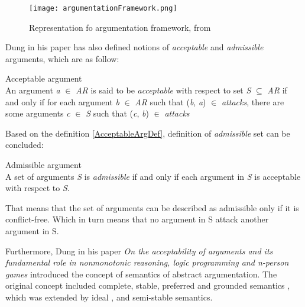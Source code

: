 \begin{figure}[h]
	\centering
	\texttt{[image: argumentationFramework.png]}
	\caption{Representation fo argumentation framework, from \cite{argumentationFrameworkExample}}
	\label{fig:argumentationFrameworkFigure}
\end{figure}
 
Dung in his paper \cite{dung1995} has also defined notions of \textit{acceptable} and \textit{admissible} arguments, which are as follow:

\begin{definition}{Acceptable argument}
\label{AcceptableArgDef}\\
An argument \textit{a} $\in$ \textit{AR} is said to be \textit{acceptable} with respect to set \textit{S} $\subseteq$ \textit{AR} if and only if for each argument \textit{b} $\in$ \textit{AR} such that (\textit{b}, \textit{a}) $\in$ \textit{attacks}, there are some arguments \textit{c} $\in$ \textit{S} such that (\textit{c}, \textit{b}) $\in$ \textit{attacks}
\end{definition}

Based on the definition \ref{AcceptableArgDef}, definition of \textit{admissible} set can be concluded:

\begin{definition}{Admissible argument}
\label{AdmissibleArgDef}\\
A set of arguments \textit{S} is \textit{admissible} if and only if each argument in \textit{S} is acceptable with respect to \textit{S}.
\end{definition}

That means that the set of arguments can be described as admissible only if it is conflict-free. Which in turn means that no argument in S attack another argument in S.

Furthermore, Dung in his paper \textit{On the acceptability of arguments and its fundamental role in nonmonotonic reasoning, logic programming and n-person games} introduced the concept of semantics of abstract argumentation. The original concept included complete, stable, preferred and grounded semantics \cite{dung1995}, which was extended by ideal \cite{dung2007computing}, and semi-stable \cite{caminada2006semi} semantics.


